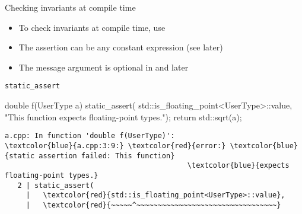 \begin{frame}[fragile]
  \begin{block}{Checking invariants at compile time}
    \begin{itemize}
      \item To check invariants at compile time, use 
      \item The assertion can be any constant expression (see later)
      \item The message argument is optional in  and later
    \end{itemize}
  \end{block}
  \begin{exampleblock}{\texttt{static\_assert}}
    \small
    \begin{cppcode*}{}
      double f(UserType a) {
        static_assert(
          std::is_floating_point<UserType>::value,
          "This function expects floating-point types.");
        return std::sqrt(a);
      }
    \end{cppcode*}
  \end{exampleblock}
  \scriptsize
  \begin{Verbatim}[commandchars=\\\{\}]
a.cpp: In function 'double f(UserType)':
\textcolor{blue}{a.cpp:3:9:} \textcolor{red}{error:} \textcolor{blue}{static assertion failed: This function}
                                           \textcolor{blue}{expects floating-point types.}
   2 | static_assert(
     |   \textcolor{red}{std::is_floating_point<UserType>::value},
     |   \textcolor{red}{~~~~~^~~~~~~~~~~~~~~~~~~~~~~~~~~~~~~~~~}
  \end{Verbatim}
\end{frame}
